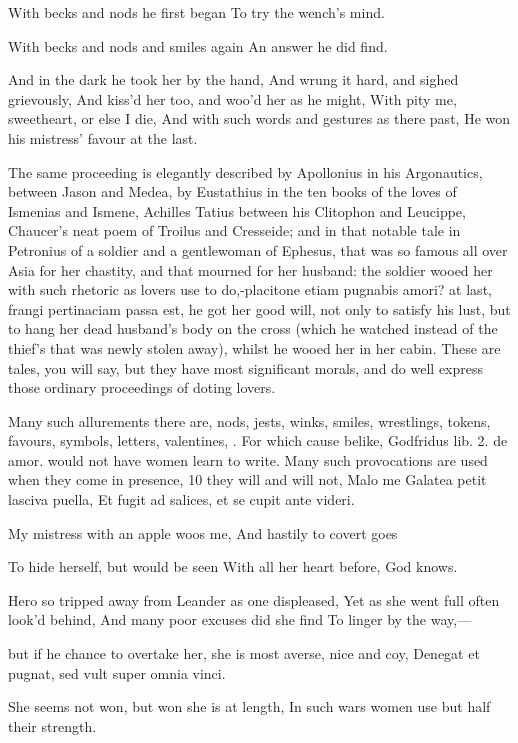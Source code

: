 With becks and nods he first began
To try the wench's mind.

With becks and nods and smiles again
An answer he did find.

And in the dark he took her by the hand,
And wrung it hard, and sighed grievously,
And kiss'd her too, and woo'd her as he might,
With pity me, sweetheart, or else I die,
And with such words and gestures as there past,
He won his mistress' favour at the last.

The same proceeding is elegantly described by Apollonius in his
Argonautics, between Jason and Medea, by Eustathius in the ten books of
the loves of Ismenias and Ismene, Achilles Tatius between his Clitophon
and Leucippe, Chaucer's neat poem of Troilus and Cresseide; and in that
notable tale in Petronius of a soldier and a gentlewoman of Ephesus,
that was so famous all over Asia for her chastity, and that mourned for
her husband: the soldier wooed her with such rhetoric as lovers use to
do,-placitone etiam pugnabis amori? \etc{} at last, frangi pertinaciam
passa est, he got her good will, not only to satisfy his lust,
but to hang her dead husband's body on the cross (which he
watched instead of the thief's that was newly stolen away), whilst he
wooed her in her cabin. These are tales, you will say, but they have
most significant morals, and do well express those ordinary proceedings
of doting lovers.

Many such allurements there are, nods, jests, winks, smiles,
wrestlings, tokens, favours, symbols, letters, valentines, \etc{}. For
which cause belike, Godfridus lib. 2. de amor. would not have women
learn to write. Many such provocations are used when they come in
presence, 10 they will and will not,
Malo me Galatea petit lasciva puella,
Et fugit ad salices, et se cupit ante videri.


My mistress with an apple woos me,
And hastily to covert goes

To hide herself, but would be seen
With all her heart before, God knows.

Hero so tripped away from Leander as one displeased,
Yet as she went full often look'd behind,
And many poor excuses did she find
To linger by the way,---

but if he chance to overtake her, she is most averse, nice and coy,
Denegat et pugnat, sed vult super omnia vinci.

She seems not won, but won she is at length,
In such wars women use but half their strength.

